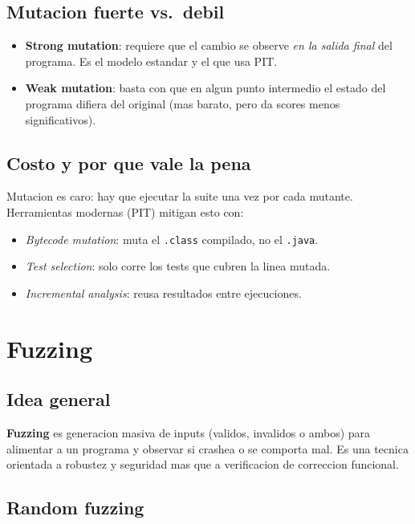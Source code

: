 \documentclass[12pt,a4paper]{article}
\begin{document}
\subsection{Mutacion fuerte vs.\ debil}

\begin{itemize}
  \item \textbf{Strong mutation}: requiere que el cambio se observe \emph{en la salida final}
  del programa. Es el modelo estandar y el que usa PIT.
  \item \textbf{Weak mutation}: basta con que en algun punto intermedio el estado del programa
  difiera del original (mas barato, pero da scores menos significativos).
\end{itemize}

\subsection{Costo y por que vale la pena}

Mutacion es caro: hay que ejecutar la suite una vez por cada mutante. Herramientas modernas
(PIT) mitigan esto con:

\begin{itemize}
  \item \emph{Bytecode mutation}: muta el \texttt{.class} compilado, no el \texttt{.java}.
  \item \emph{Test selection}: solo corre los tests que cubren la linea mutada.
  \item \emph{Incremental analysis}: reusa resultados entre ejecuciones.
\end{itemize}

\section{Fuzzing}

\subsection{Idea general}

\textbf{Fuzzing} es generacion masiva de inputs (validos, invalidos o ambos) para alimentar a
un programa y observar si crashea o se comporta mal. Es una tecnica orientada a robustez y
seguridad mas que a verificacion de correccion funcional.

\subsection{Random fuzzing}
\end{document}
